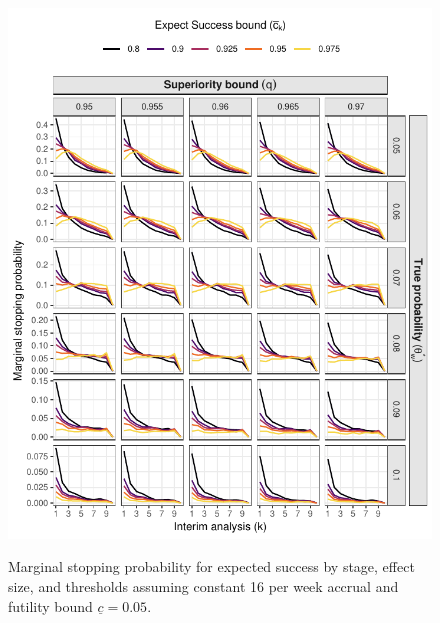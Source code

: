 \documentclass{bmcart}
\begin{document}
\begin{figure}[!ht]
	\caption{Marginal stopping probability for expected success by stage, effect size, and thresholds assuming constant 16 per week accrual and futility bound $\underline{c}=0.05$.}
	\includegraphics{figures/stop_expect_success_16.pdf}
	\label{fig:stop_expect_success_16}
\end{figure}
\end{document}
